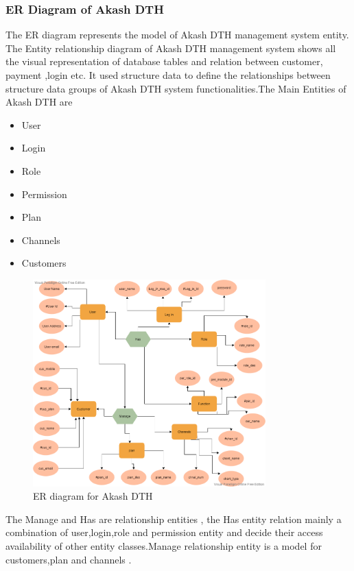 \begin{spacing}{1}
\subsubsection{ER Diagram of Akash DTH}
The ER diagram represents the model of Akash DTH management system entity. The Entity relationship diagram of Akash DTH management system shows all the visual representation of database tables and relation between customer, payment ,login etc. It used structure data to define the relationships between structure data groups of Akash DTH system functionalities.The Main Entities of Akash DTH are

\begin{itemize}
	\item User
	\item Login
	\item Role
	\item Permission
	\item Plan
	\item Channels
	\item Customers
\end{itemize}

\begin{figure}[H]
	\centering
	\includegraphics[width=0.8\textwidth]{ER}
	\caption{ER diagram for Akash DTH}
	\label{fig:er}
\end{figure}

The Manage and Has are relationship entities , the Has entity relation mainly a combination of user,login,role and permission entity and decide their access availability of other entity classes.Manage relationship entity is a model for customers,plan and channels .


\end{spacing}

